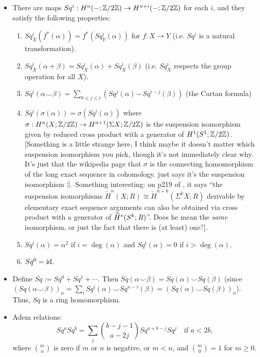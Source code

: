 \documentclass{MetricNotes2023}
\def\inte{\ensuremath\mathbb{Z}}
\def\id{\ensuremath\text{id}}
\def\wildetilde{\ensuremath\widetilde}
\begin{document}
\begin{itemize}
\item There are maps \(Sq^i : H^n(-; \inte/2\inte)\to H^{n+i}(- ; \inte/2\inte)\) for each \(i\), and they satisfy the following properties: \begin{enumerate}
\item \(Sq^i_X(f^*(\alpha))=f^*(Sq^i_Y(\alpha))\) for \(f : X \to Y\) (i.e. \(Sq^i\) is a natural transformation).
\item \(Sq^i_X(\alpha + \beta)=Sq^i_X(\alpha)+Sq^i_X(\beta)\) (i.e. \(Sq_X^i\) respects the group operation for all \(X\)).
\item \(Sq^i(\alpha \smile \beta)=\sum\limits_{0\leq j \leq i} (Sq^j(\alpha)\smile Sq^{i-j}(\beta))\) (the Cartan formula)
\item \(Sq^i(\sigma(\alpha))=\sigma(Sq^i(\alpha))\) where \(\sigma : H^n(X; \inte/2\inte)\to H^{n+1}(\Sigma X; \inte/2\inte)\) is the suspension isomorphism given by reduced cross product with a generator of \(H^1(S^1; \inte/2\inte)\). [Something is a little strange here, I think maybe it doesn't matter which suspension isomorphism you pick, though it's not immediately clear why. It's just that the wikipedia page that \(\sigma\) is the connecting homomorphism of the long exact sequence in cohomology. \autocite{rognes2} just says it's the suspension isomorphism \(:\hspace{-0.75ex}|\). Something interesting: on p219 of \autocite{hatcher}, it says ``the suspension isomorphisms \(\widetilde H^n(X;R)\cong \widetilde H^{n+k}(\Sigma^kX;R)\) derivable by elementary exact sequence arguments can also be obtained via cross product with a generator of \(\wildetilde H^*(S^k; R)\)''. Does he mean the \textit{same} isomorphism, or just the fact that there is (at least) one?].
\item \(Sq^i(\alpha)=\alpha^2\) if \(i=\deg(\alpha)\) and \(Sq^i(\alpha)=0\) if \(i> \deg(\alpha)\). 
\item \(Sq^0=\id.\)
\end{enumerate}
\item Define \(Sq:=Sq^0+Sq^1+\cdots\). Then \(Sq(\alpha\smile \beta)=Sq(\alpha)\smile Sq(\beta)\) (since \((Sq(\alpha\smile \beta))_n=\sum_iSq^i(\alpha)\smile Sq^{n-i}(\beta)=(Sq(\alpha)\smile Sq(\beta))_n\)). Thus, \(Sq\) is a ring homomorphism. 
\item Adem relations:
\[Sq^aSq^b=\sum_j {b-j-1\choose a-2j}Sq^{a+b-j}Sq^j \quad \text{if } a<2b,\]
where \({m \choose n}\) is zero if \(m\) or \(n\) is negative, or \(m<n\), and \({m \choose 0}=1\) for \(m \geq 0\).
\end{itemize}
\end{document}
